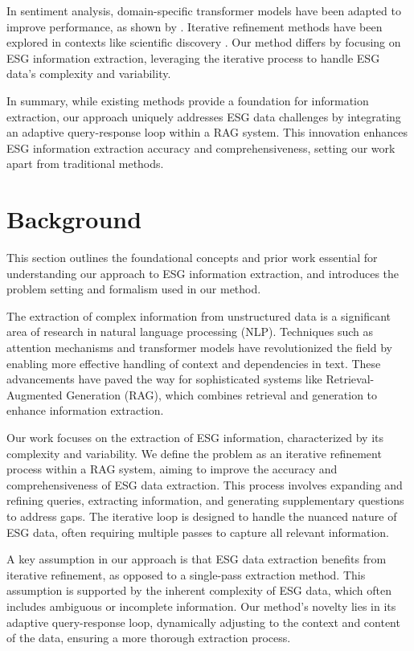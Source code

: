 \documentclass{article} %
\begin{document}
In sentiment analysis, domain-specific transformer models have been adapted to improve performance, as shown by \citet{Bansal2022AdaptationOD}. Iterative refinement methods have been explored in contexts like scientific discovery \citep{lu2024aiscientist}. Our method differs by focusing on ESG information extraction, leveraging the iterative process to handle ESG data's complexity and variability.

In summary, while existing methods provide a foundation for information extraction, our approach uniquely addresses ESG data challenges by integrating an adaptive query-response loop within a RAG system. This innovation enhances ESG information extraction accuracy and comprehensiveness, setting our work apart from traditional methods.

\section{Background}
\label{sec:background}

This section outlines the foundational concepts and prior work essential for understanding our approach to ESG information extraction, and introduces the problem setting and formalism used in our method.

The extraction of complex information from unstructured data is a significant area of research in natural language processing (NLP). Techniques such as attention mechanisms \citep{vaswani2017attention} and transformer models \citep{radford2019language} have revolutionized the field by enabling more effective handling of context and dependencies in text. These advancements have paved the way for sophisticated systems like Retrieval-Augmented Generation (RAG), which combines retrieval and generation to enhance information extraction.

Our work focuses on the extraction of ESG information, characterized by its complexity and variability. We define the problem as an iterative refinement process within a RAG system, aiming to improve the accuracy and comprehensiveness of ESG data extraction. This process involves expanding and refining queries, extracting information, and generating supplementary questions to address gaps. The iterative loop is designed to handle the nuanced nature of ESG data, often requiring multiple passes to capture all relevant information.

A key assumption in our approach is that ESG data extraction benefits from iterative refinement, as opposed to a single-pass extraction method. This assumption is supported by the inherent complexity of ESG data, which often includes ambiguous or incomplete information. Our method's novelty lies in its adaptive query-response loop, dynamically adjusting to the context and content of the data, ensuring a more thorough extraction process.
\end{document}

